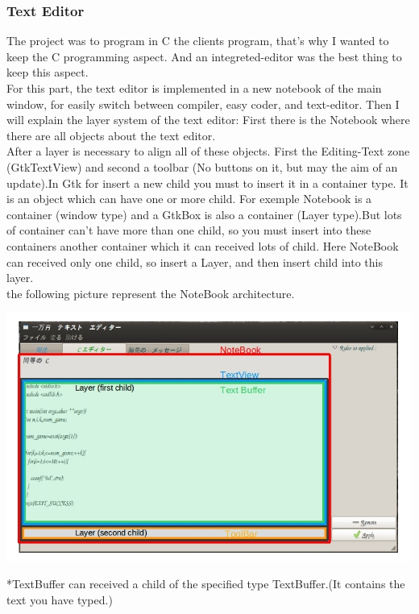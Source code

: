 \documentclass[11pt]{sample}
\begin{document}
\subsubsection{Text Editor}
The project was to program in C the clients program, that's why I wanted to keep the C programming aspect. And an integreted-editor was the best thing to keep this aspect.\\
For this part, the text editor is implemented in a new notebook of the main window, for easily switch between compiler, easy coder, and text-editor. Then I will explain the layer system of the text editor: First there is the Notebook where there are all objects about the text editor.\\After a layer is necessary to align all of these objects. First the Editing-Text zone (GtkTextView) and second a toolbar (No buttons on it, but may the aim of an update).In Gtk for insert a new child you must to insert it in a container type. It is an object which can have one or more child. For exemple Notebook is a container (window type) and a GtkBox is also a container (Layer type).But lots of container can't have more than one child, so you must insert into these containers another container which it can received lots of child. Here NoteBook can received only one child, so insert a Layer, and then insert child into this layer.\\ the following picture represent the NoteBook architecture.
\begin{center}\includegraphics[height=22\baselineskip]{img/Layer-Architecture.jpg}\end{center}
\begin{tiny}*TextBuffer can received a child of the specified type TextBuffer.(It contains the text you have typed.)\end{tiny}
\end{document}
